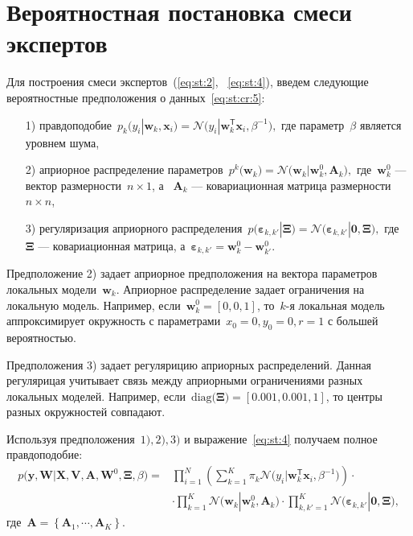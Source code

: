 \documentclass[12pt, twoside]{article}
\numberwithin{equation}{section}
\begin{document}
\section{Вероятностная постановка смеси экспертов}
Для построения смеси экспертов~(\ref{eq:st:2}, ~\ref{eq:st:4}), введем следующие вероятностные предположения о данных~\eqref{eq:st:cr:5}:

\begin{enumerate}
	\item[1)] правдоподобие~$p_{k}\bigr(y_{i}|\mathbf{w}_{k}, \mathbf{x}_{i}\bigr) = \mathcal{N}\bigr(y_{i}|\mathbf{w}_{k}^{\mathsf{T}}\mathbf{x}_{i}, \beta^{-1}\bigr),$ где параметр~$\beta$ является уровнем шума,
	\item[2)] априорное распределение параметров~$p^{k}\bigr(\mathbf{w}_{k}\bigr) = \mathcal{N}\bigr(\mathbf{w}_{k}|\mathbf{w}^{0}_{k}, \mathbf{A}_{k}\bigr),$ где~$\mathbf{w}^{0}_{k}$ --- вектор размерности~$n\times1$, а ~$\mathbf{A}_{k}$ --- ковариационная матрица размерности~$n\times n$,
	\item[3)] регуляризация априорного распределения~$p\bigr(\bm{\varepsilon}_{k,k'}|\bm{\Xi}\bigr) = \mathcal{N}\bigr(\bm{\varepsilon}_{k,k'}|\mathbf{0},  \bm{\Xi}\bigr),$ где~$\bm{\Xi}$ --- ковариационная матрица, а~$\bm{\varepsilon}_{k,k'} = \mathbf{w}_{k}^{0}-\mathbf{w}_{k'}^{0}.$
\end{enumerate}
Предположение 2) задает априорное предположения на вектора параметров локальных модели~$\textbf{w}_k$. Априорное распределение  задает ограничения на локальную модель. Например, если~$\textbf{w}_k^{0} = [0,0,1]$, то~$k$-я локальная модель аппроксимирует окружность с параметрами~$x_0=0, y_0=0, r=1$ с большей вероятностью.

Предположения 3) задает регулярицию априорных распределений. Данная регулярицая учитывает связь между априорными ограничениями разных локальных моделей. Например, если~$\text{diag}\bigr(\bm{\Xi}\bigr)=[0.001, 0.001, 1]$, то  центры разных окружностей совпадают.

Используя предположения~$1), 2), 3)$ и выражение~\eqref{eq:st:4} получаем полное правдоподобие:
\[
\label{eq:em:1}
\begin{aligned}
p\bigr(\mathbf{y}, \mathbf{W}|\mathbf{X}, \mathbf{V}, \textbf{A}, \textbf{W}^{0}, \bm{\Xi}, \beta\bigr) = &\prod_{i=1}^{N}\left(\sum_{k=1}^{K}\pi_{k}\mathcal{N}\bigr(y_{i}|\mathbf{w}_{k}^{\mathsf{T}}\mathbf{x}_{i}, \beta^{-1}\bigr)\right)\cdot\\
&\cdot\prod_{k=1}^{K}\mathcal{N}\bigr(\mathbf{w}_{k}|\mathbf{w}^{0}_{k}, \mathbf{A}_{k}\bigr)\cdot\prod_{k,k'=1}^{K}\mathcal{N}\bigr(\bm{\varepsilon}_{k,k'}|\mathbf{0},  \bm{\Xi}\bigr),
\end{aligned}
\]
 где~$\mathbf{A} = \left\{\mathbf{A}_1, \cdots, \mathbf{A}_K\right\}.$
 
\end{document}
